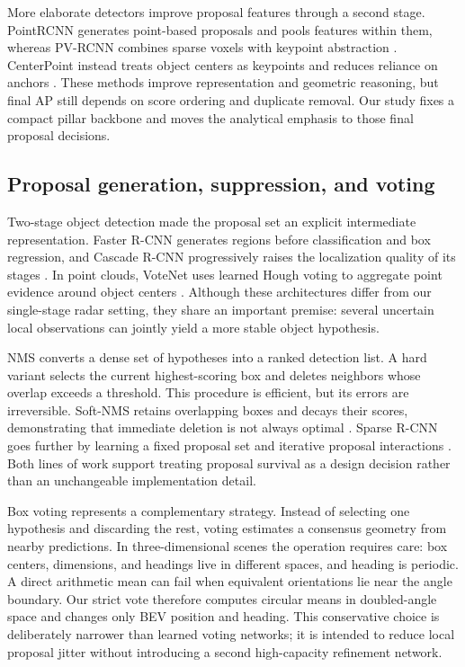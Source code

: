\documentclass[final,5p,times]{elsarticle}
\begin{document}
More elaborate detectors improve proposal features through a second stage.
PointRCNN generates point-based proposals and pools features within them,
whereas PV-RCNN combines sparse voxels with keypoint abstraction
\cite{shi2019pointrcnn,shi2020pvrcnn}. CenterPoint instead treats object
centers as keypoints and reduces reliance on anchors
\cite{yin2021centerpoint}. These methods improve representation and geometric
reasoning, but final AP still depends on score ordering and duplicate removal.
Our study fixes a compact pillar backbone and moves the analytical emphasis to
those final proposal decisions.

\subsection{Proposal generation, suppression, and voting}

Two-stage object detection made the proposal set an explicit intermediate
representation. Faster R-CNN generates regions before classification and box
regression, and Cascade R-CNN progressively raises the localization quality of
its stages \cite{ren2017fasterrcnn,cai2018cascadercnn}. In point clouds,
VoteNet uses learned Hough voting to aggregate point evidence around object
centers \cite{qi2019votenet}. Although these architectures differ from our
single-stage radar setting, they share an important premise: several uncertain
local observations can jointly yield a more stable object hypothesis.

NMS converts a dense set of hypotheses into a ranked detection list. A hard
variant selects the current highest-scoring box and deletes neighbors whose
overlap exceeds a threshold. This procedure is efficient, but its errors are
irreversible. Soft-NMS retains overlapping boxes and decays their scores,
demonstrating that immediate deletion is not always optimal
\cite{bodla2017softnms}. Sparse R-CNN goes further by learning a fixed proposal
set and iterative proposal interactions \cite{sun2021sparsercnn}. Both lines
of work support treating proposal survival as a design decision rather than an
unchangeable implementation detail.

Box voting represents a complementary strategy. Instead of selecting one
hypothesis and discarding the rest, voting estimates a consensus geometry from
nearby predictions. In three-dimensional scenes the operation requires care:
box centers, dimensions, and headings live in different spaces, and heading is
periodic. A direct arithmetic mean can fail when equivalent orientations lie
near the angle boundary. Our strict vote therefore computes circular means in
doubled-angle space and changes only BEV position and heading. This conservative
choice is deliberately narrower than learned voting networks; it is intended
to reduce local proposal jitter without introducing a second high-capacity
refinement network.
\end{document}
